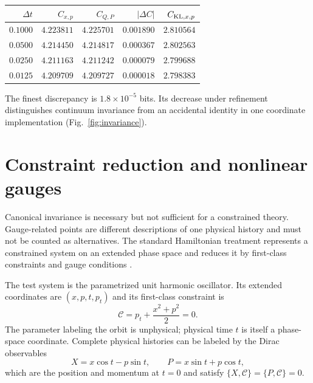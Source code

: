 \documentclass[10pt]{article}
\begin{document}
\begin{center}
\label{tab:nonlinear-test}
\small
\begin{tabular}{rrrrr}
\toprule
$\Delta t$ & $C_{x,p}$ & $C_{Q,P}$ & $|\Delta C|$ & $C_{{\rm KL},x,p}$\\
\midrule
$0.1000$ & $4.223811$ & $4.225701$ & $0.001890$ & $2.810564$\\
$0.0500$ & $4.214450$ & $4.214817$ & $0.000367$ & $2.802563$\\
$0.0250$ & $4.211163$ & $4.211242$ & $0.000079$ & $2.799688$\\
$0.0125$ & $4.209709$ & $4.209727$ & $0.000018$ & $2.798383$\\
\bottomrule
\end{tabular}
\end{center}

The finest discrepancy is $1.8\times10^{-5}$ bits.  Its decrease under
refinement distinguishes continuum invariance from an accidental identity in
one coordinate implementation (Fig.~\ref{fig:invariance}).

\section*{Constraint reduction and nonlinear gauges}

Canonical invariance is necessary but not sufficient for a constrained
theory.  Gauge-related points are different descriptions of one physical
history and must not be counted as alternatives.  The standard Hamiltonian
treatment represents a constrained system on an extended phase space and
reduces it by first-class constraints and gauge conditions
\citep{Dirac1964,HenneauxTeitelboim1992}.

The test system is the parametrized unit harmonic oscillator.  Its extended
coordinates are $(x,p,t,p_t)$ and its first-class constraint is
\begin{equation}
\mathcal C=p_t+\frac{x^2+p^2}{2}=0.
\label{eq:parametrized-constraint}
\end{equation}
The parameter labeling the orbit is unphysical; physical time $t$ is itself a
phase-space coordinate.  Complete physical histories can be labeled by the
Dirac observables
\begin{equation}
X=x\cos t-p\sin t,
\qquad
P=x\sin t+p\cos t,
\label{eq:dirac-observables}
\end{equation}
which are the position and momentum at $t=0$ and satisfy
$\{X,\mathcal C\}=\{P,\mathcal C\}=0$.
\end{document}
